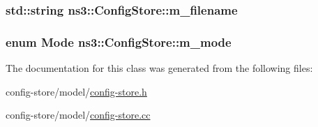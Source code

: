 \subsubsection[{\texorpdfstring{m\+\_\+filename}{m_filename}}]{\setlength{\rightskip}{0pt plus 5cm}std\+::string ns3\+::\+Config\+Store\+::m\+\_\+filename\hspace{0.3cm}{\ttfamily [private]}}\hypertarget{classns3_1_1ConfigStore_a0c88a6e7f8ab840fcb1693a3004b8857}{}\label{classns3_1_1ConfigStore_a0c88a6e7f8ab840fcb1693a3004b8857}
\subsubsection[{\texorpdfstring{m\+\_\+mode}{m_mode}}]{\setlength{\rightskip}{0pt plus 5cm}enum {\bf Mode} ns3\+::\+Config\+Store\+::m\+\_\+mode\hspace{0.3cm}{\ttfamily [private]}}\hypertarget{classns3_1_1ConfigStore_a25f0762ed713df1ce93d5c9738d9acae}{}\label{classns3_1_1ConfigStore_a25f0762ed713df1ce93d5c9738d9acae}


The documentation for this class was generated from the following files\+:\begin{DoxyCompactItemize}
\item 
config-\/store/model/\hyperlink{config-store_8h}{config-\/store.\+h}\item 
config-\/store/model/\hyperlink{config-store_8cc}{config-\/store.\+cc}\end{DoxyCompactItemize}
